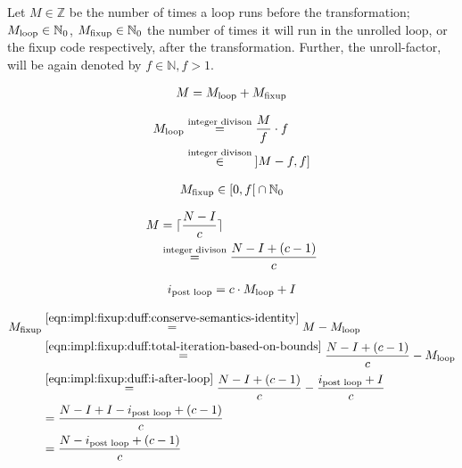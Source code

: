 Let $M \in \mathbb{Z}$ be the number of times a loop runs before the transformation; $M_{\text{loop}} \in \mathbb{N}_0$, $M_{\text{fixup}} \in \mathbb{N}_0$ the number of times it will run in the unrolled loop, or the fixup code respectively, after the transformation.
Further, the unroll-factor, will be again denoted by $f \in \mathbb{N}, f > 1$.

\begin{equation}\label{eqn:impl:fixup:duff:conserve-semantics-identity}
    \begin{aligned}
        M = M_{\text{loop}} + M_{\text{fixup}}
    \end{aligned}
\end{equation}

\begin{equation}\label{eqn:impl:fixup:duff:loop-iterations}
    \begin{aligned}
        M_{\text{loop}} &\overset{\text{integer divison}}{=} \frac{M}{f} \cdot f\\
        &\overset{\text{integer divison}}{\in} \medspace \rbrack M-f,f \rbrack
    \end{aligned}
\end{equation}

\begin{equation}\label{eqn:impl:fixup:duff:fixup-interval}
    \begin{aligned}
        M_{\text{fixup}} \in \lbrack0, f\lbrack \medspace \cap \medspace \mathbb{N}_0
    \end{aligned}
\end{equation}

\begin{equation}\label{eqn:impl:fixup:duff:total-iteration-based-on-bounds}
    \begin{aligned}
        M &= \lceil{}\frac{N - I}{c}\rceil{} \\
        & \overset{\text{integer divison}}{=} \frac{N - I + (c - 1)}{c}
    \end{aligned}
\end{equation}

\begin{equation}\label{eqn:impl:fixup:duff:i-after-loop}
    \begin{aligned}
        i_\text{post loop} = c \cdot M_{\text{loop}} + I
    \end{aligned}
\end{equation}

\begin{equation}\label{eqn:impl:fixup:duff:fixup-i}
    \begin{aligned}
        M_{\text{fixup}} & \overset{\ref{eqn:impl:fixup:duff:conserve-semantics-identity}}{=} M - M_{\text{loop}} \\
        & \overset{\ref{eqn:impl:fixup:duff:total-iteration-based-on-bounds}}{=}
            \frac{N - I + (c - 1)}{c} - M_{\text{loop}} \\
        & \overset{\ref{eqn:impl:fixup:duff:i-after-loop}}{=}
        \frac{N - I + (c - 1)}{c} - \frac{i_\text{post loop} + I}{c} \\
        &= \frac{N - I + I - i_\text{post loop} + (c - 1)}{c}\\
        &= \frac{N - i_\text{post loop} + (c - 1)}{c}
    \end{aligned}
\end{equation}

